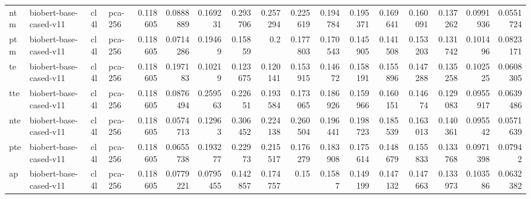 \begin{tabular}{llllrrrrrrrrrrrrr}
 ntm         & biobert-base-cased-v11 & cl4l             & pca-256               &         0.118605 &        0.0888889 &        0.169231  &        0.293706  &         0.257294 &         0.225619 &        0.194784  &        0.195371  &         0.169641 &         0.160091 &          0.137262 &         0.0991936 &         0.0551724 \\
 ptm         & biobert-base-cased-v11 & cl4l             & pca-256               &         0.118605 &        0.0714286 &        0.19469   &        0.15859   &         0.2      &         0.177803 &        0.170543  &        0.145905  &         0.141508 &         0.153203 &          0.131742 &         0.101496  &         0.0823171 \\
 te          & biobert-base-cased-v11 & cl4l             & pca-256               &         0.118605 &        0.197183  &        0.10219   &        0.123675  &         0.120141 &         0.153915 &        0.14672   &        0.158191  &         0.155896 &         0.147288 &          0.135258 &         0.102525  &         0.0608305 \\
 tte         & biobert-base-cased-v11 & cl4l             & pca-256               &         0.118605 &        0.0876494 &        0.259563  &        0.22651   &         0.193584 &         0.173065 &        0.186926  &        0.159966  &         0.160151 &         0.14674  &          0.129083 &         0.0955917 &         0.0639486 \\
 nte         & biobert-base-cased-v11 & cl4l             & pca-256               &         0.118605 &        0.0574713 &        0.12963   &        0.306452  &         0.224138 &         0.260504 &        0.196441  &        0.198723  &         0.185539 &         0.163013 &          0.140361 &         0.095542  &         0.0571639 \\
 pte         & biobert-base-cased-v11 & cl4l             & pca-256               &         0.118605 &        0.0655738 &        0.193277  &        0.22973   &         0.215517 &         0.176279 &        0.183908  &        0.175614  &         0.148679 &         0.155833 &          0.133768 &         0.0971398 &         0.07942   \\
 ap          & biobert-base-cased-v11 & cl4l             & pca-256               &         0.118605 &        0.0779221 &        0.0795455 &        0.142857  &         0.174757 &         0.15     &        0.1587    &        0.149199  &         0.147132 &         0.147663 &          0.133973 &         0.103586  &         0.0632382 \\

\end{tabular}
